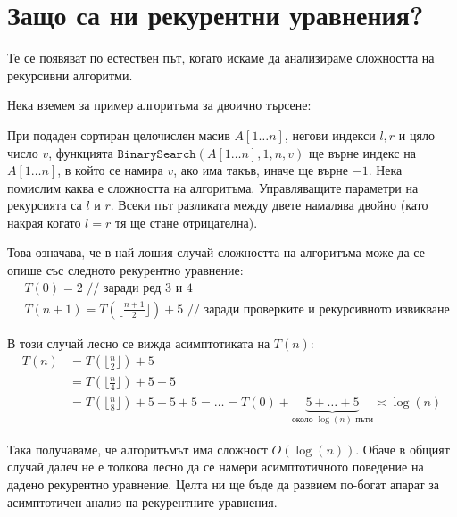 \section{Защо са ни рекурентни уравнения?}

Те се появяват по естествен път, когато искаме да анализираме сложността на рекурсивни алгоритми.

Нека вземем за пример алгоритъма за двоично търсене:


При подаден сортиран целочислен масив $A[1 \dots n]$, негови индекси $l, r$ и цяло число $v$, функцията $\mathtt{BinarySearch}(A[1 \dots n], 1, n, v)$ ще върне индекс на $A[1 \dots n]$, в който се намира $v$, ако има такъв, иначе ще върне $-1$.
Нека помислим каква е сложността на алгоритъма.
Управляващите параметри на рекурсията са $l$ и $r$.
Всеки път разликата между двете намалява двойно (като накрая когато $l = r$ тя ще стане отрицателна).

Това означава, че в най-лошия случай сложността на алгоритъма може да се опише със следното рекурентно уравнение:
\begin{align*}
     & T(0) = 2 \text{ // заради ред } 3 \text{ и } 4                                                          \\
     & T(n + 1) = T(\lfloor \frac{n + 1}{2} \rfloor) + 5 \text{ // заради проверките и рекурсивното извикване}
\end{align*}

В този случай лесно се вижда асимптотиката на $T(n)$:
\begin{align*}
    T(n) & = T(\lfloor \frac{n}{2} \rfloor) + 5                                                                                                         \\
         & = T(\lfloor \frac{n}{4} \rfloor) + 5 + 5                                                                                                     \\
         & = T(\lfloor \frac{n}{8} \rfloor) + 5 + 5 + 5 = \dots = T(0) + \underbrace{5 + \dots + 5}_{\text{около } \log(n) \text{ пъти}} \asymp \log(n)
\end{align*}

Така получаваме, че алгоритъмът има сложност $O(\log(n))$.
Обаче в общият случай далеч не е толкова лесно да се намери асимптотичното поведение на дадено рекурентно уравнение.
Целта ни ще бъде да развием по-богат апарат за асимптотичен анализ на рекурентните уравнения.

